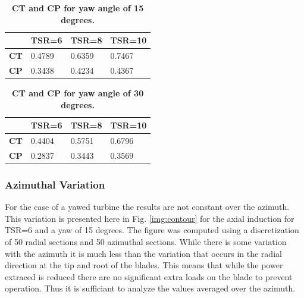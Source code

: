 \begin{table}[htbp]
\caption{\textbf{CT and CP for yaw angle of 15 degrees.}}
\begin{tabular}{|l|l|l|l|}
\hline
   & \textbf{TSR=6} & \textbf{TSR=8} & \textbf{TSR=10}  \\ \hline
\textbf{CT} &   0.4789    &  0.6359     &   0.7467     \\ \hline
\textbf{CP} &   0.3438    &  0.4234     &   0.4367     \\ \hline
\end{tabular}
\label{tbl:coef-15}
\end{table}


\begin{table}[htbp]
\caption{\textbf{CT and CP for yaw angle of 30 degrees.}}
\begin{tabular}{|l|l|l|l|}
\hline
   & \textbf{TSR=6} & \textbf{TSR=8} & \textbf{TSR=10}  \\ \hline
\textbf{CT} &   0.4404    &  0.5751     &   0.6796     \\ \hline
\textbf{CP} &   0.2837    &  0.3443     &   0.3569     \\ \hline
\end{tabular}
\label{tbl:coef-30}
\end{table}

\subsubsection{\textbf{Azimuthal Variation} }
For the case of a yawed turbine the results are not constant over the azimuth. This variation is presented here in Fig. \ref{img:contour} for the axial induction for TSR=6 and a yaw of 15 degrees. The figure was computed using a discretization of 50 radial sections and 50 azimuthal sections. While there is some variation with the azimuth it is much less than the variation that occurs in the radial direction at the tip and root of the blades. This means that while the power extraced is reduced there are no significant extra loads on the blade to prevent operation. Thus it is sufficiant to analyze the values averaged over the azimuth.

